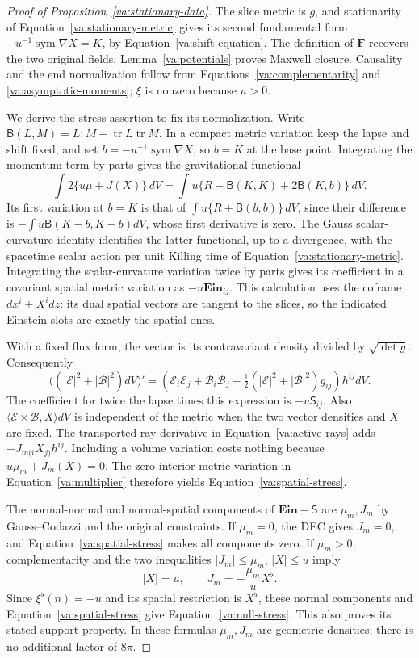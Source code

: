 \begin{proof}[Proof of Proposition~\ref{va:stationary-data}]
The slice metric is \(g\), and stationarity of
Equation~\eqref{va:stationary-metric} gives its second fundamental form
\(-u^{-1}\operatorname{sym}\nabla X=K\), by
Equation~\eqref{va:shift-equation}.  The definition of \(\mathbf F\)
recovers the two original fields.  Lemma~\ref{va:potentials} proves
Maxwell closure.  Causality and the end normalization follow from
Equations~\eqref{va:complementarity} and
\eqref{va:asymptotic-moments}; \(\xi\) is nonzero because \(u>0\).

We derive the stress assertion to fix its normalization.  Write
\(\mathsf B(L,M)=L:M-\operatorname{tr}L\operatorname{tr}M\).
In a compact metric variation keep the lapse and shift fixed, and set
\(b=-u^{-1}\operatorname{sym}\nabla X\), so \(b=K\) at the base
point.  Integrating the momentum term by parts gives the gravitational
functional
\[
 \int 2\{u\mu+J(X)\}\,dV
 =\int u\{R-\mathsf B(K,K)+2\mathsf B(K,b)\}\,dV.
\]
Its first variation at \(b=K\) is that of
\(\int u\{R+\mathsf B(b,b)\}\,dV\), since their difference is
\(-\int u\mathsf B(K-b,K-b)dV\), whose first derivative is zero.
The Gauss scalar-curvature identity identifies the latter functional,
up to a divergence, with the spacetime scalar action per unit Killing
time of Equation~\eqref{va:stationary-metric}.  Integrating the
scalar-curvature variation twice by parts gives its coefficient in a
covariant spatial metric variation as \(-u\mathbf{Ein}_{ij}\).
This calculation uses the coframe \(dx^i+X^i dz\): its dual spatial
vectors are tangent to the slices, so the indicated Einstein slots are
exactly the spatial ones.

With a fixed flux form, the vector is its contravariant density divided
by \(\sqrt{\det g}\).  Consequently
\[
 \bigl((|\mathcal E|^2+|\mathcal B|^2)dV\bigr)'
 =\left(\mathcal E_i\mathcal E_j+\mathcal B_i\mathcal B_j
 -\tfrac12(|\mathcal E|^2+|\mathcal B|^2)g_{ij}\right)h^{ij}dV.
\]
The coefficient for twice the lapse times this expression is
\(-u\mathsf S_{ij}\).  Also
\(\langle\mathcal E\times\mathcal B,X\rangle dV\) is independent
of the metric when the two vector densities and \(X\) are fixed.
The transported-ray derivative in Equation~\eqref{va:active-rays}
adds \(-J_{m(i}X_{j)}h^{ij}\).  Including a volume variation costs
nothing because \(u\mu_m+J_m(X)=0\).  The zero interior metric
variation in Equation~\eqref{va:multiplier} therefore yields
Equation~\eqref{va:spatial-stress}.

The normal-normal and normal-spatial components of
\(\mathbf{Ein}-\mathsf S\) are \(\mu_m,J_m\) by Gauss--Codazzi
and the original constraints.  If \(\mu_m=0\), the DEC gives
\(J_m=0\), and Equation~\eqref{va:spatial-stress} makes all
components zero.  If \(\mu_m>0\), complementarity and the two
inequalities \(|J_m|\le\mu_m\), \(|X|\le u\) imply
\[
 |X|=u,\qquad J_m=-\frac{\mu_m}{u}X^\flat.
\]
Since \(\xi^\flat(n)=-u\) and its spatial restriction is
\(X^\flat\), these normal components and
Equation~\eqref{va:spatial-stress} give
Equation~\eqref{va:null-stress}.  This also proves its stated support
property.  In these formulas \(\mu_m,J_m\) are geometric densities;
there is no additional factor of \(8\pi\).
\end{proof}

